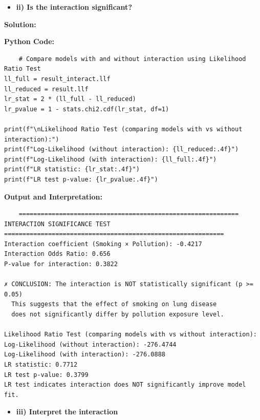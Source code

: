 \documentclass[12pt]{article}
\begin{document}
\vspace{0.3cm}

\begin{itemize}
    \item\textbf{ii) Is the interaction significant?}
\end{itemize}

{\large\textbf{Solution:}}

\vspace{0.3cm}

{\large\textbf{Python Code:}}
\begin{verbatim}
    # Compare models with and without interaction using Likelihood Ratio Test
ll_full = result_interact.llf
ll_reduced = result.llf
lr_stat = 2 * (ll_full - ll_reduced)
lr_pvalue = 1 - stats.chi2.cdf(lr_stat, df=1)

print(f"\nLikelihood Ratio Test (comparing models with vs without interaction):")
print(f"Log-Likelihood (without interaction): {ll_reduced:.4f}")
print(f"Log-Likelihood (with interaction): {ll_full:.4f}")
print(f"LR statistic: {lr_stat:.4f}")
print(f"LR test p-value: {lr_pvalue:.4f}")
\end{verbatim}

\vspace{0.3cm}

\textbf{Output and Interpretation:}

\begin{verbatim}
    ============================================================
INTERACTION SIGNIFICANCE TEST
============================================================
Interaction coefficient (Smoking × Pollution): -0.4217
Interaction Odds Ratio: 0.656
P-value for interaction: 0.3822

✗ CONCLUSION: The interaction is NOT statistically significant (p >= 0.05)
  This suggests that the effect of smoking on lung disease
  does not significantly differ by pollution exposure level.

Likelihood Ratio Test (comparing models with vs without interaction):
Log-Likelihood (without interaction): -276.4744
Log-Likelihood (with interaction): -276.0888
LR statistic: 0.7712
LR test p-value: 0.3799
LR test indicates interaction does NOT significantly improve model fit.
\end{verbatim}
\vspace{0.4cm}

\begin{itemize}
    \item\textbf{iii) Interpret the interaction}
\end{itemize}
\end{document}
